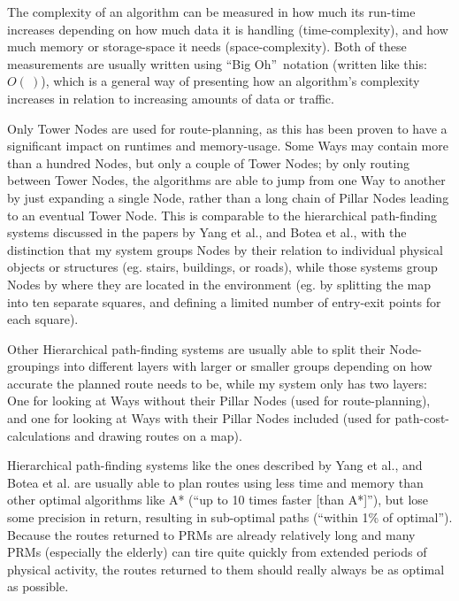 The complexity of an algorithm can be measured in how much its run-time increases depending on how much data it is handling (time-complexity), and how much memory or storage-space it needs (space-complexity). Both of these measurements are usually written using \textquotedblleft Big Oh\textquotedblright~notation (written like this: $O(~)$), which is a general way of presenting how an algorithm's complexity increases in relation to increasing amounts of data or traffic.

Only Tower Nodes are used for route-planning, as this has been proven to have a significant impact on runtimes and memory-usage\cite{CCAI07,botea-etal-jogd04}. Some Ways may contain more than a hundred Nodes, but only a couple of Tower Nodes; by only routing between Tower Nodes, the algorithms are able to jump from one Way to another by just expanding a single Node, rather than a long chain of Pillar Nodes leading to an eventual Tower Node. This is comparable to the hierarchical path-finding systems discussed in the papers by Yang et al.\cite{CCAI07}, and Botea et al.\cite{botea-etal-jogd04}, with the distinction that my system groups Nodes by their relation to individual physical objects or structures (eg. stairs, buildings, or roads), while those systems group Nodes by where they are located in the environment (eg. by splitting the map into ten separate squares, and defining a limited number of entry-exit points for each square).

Other Hierarchical path-finding systems are usually able to split their Node-groupings into different layers with larger or smaller groups depending on how accurate the planned route needs to be, while my system only has two layers: One for looking at Ways without their Pillar Nodes (used for route-planning), and one for looking at Ways with their Pillar Nodes included (used for path-cost-calculations and drawing routes on a map). 

Hierarchical path-finding systems like the ones described by Yang et al.\cite{CCAI07}, and Botea et al.\cite{botea-etal-jogd04} are usually able to plan routes using less time and memory than other optimal algorithms like A* (\textquotedblleft up to 10 times faster [than A*]\textquotedblright\cite[page. 1]{botea-etal-jogd04}), but lose some precision in return, resulting in sub-optimal paths (\textquotedblleft within 1\% of optimal\textquotedblright\cite[page. 1]{botea-etal-jogd04}). Because the routes returned to PRMs are already relatively long and many PRMs (especially the elderly) can tire quite quickly from extended periods of physical activity, the routes returned to them should really always be as optimal as possible.

